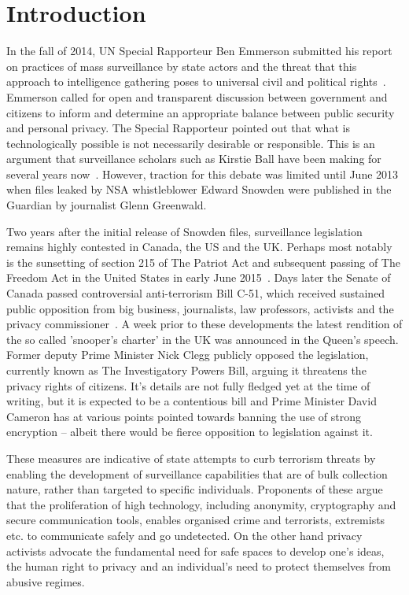 \documentclass{llncs}
\begin{document}
\section{Introduction}
\label{sec:Introduction}
In the fall of 2014, UN Special Rapporteur Ben Emmerson submitted his report on practices of mass surveillance by state actors and the threat that this approach to intelligence gathering poses to universal civil and political rights~\cite{Emerson}. Emmerson called for open and transparent discussion between government and citizens to inform and determine an appropriate balance between public security and personal privacy. The Special Rapporteur pointed out that what is technologically possible is not necessarily desirable or responsible. This is an argument that surveillance scholars such as Kirstie Ball have been making for several years now~\cite{Ball}. However, traction for this debate was limited until June 2013 when files leaked by NSA whistleblower Edward Snowden were published in the Guardian by journalist Glenn Greenwald.

Two years after the initial release of Snowden files, surveillance legislation remains highly contested in Canada, the US and the UK. Perhaps most notably is the sunsetting of section 215 of The Patriot Act and subsequent passing of The Freedom Act in the United States in early June 2015~\cite{Patriot}. Days later the Senate of Canada passed controversial anti-terrorism Bill C-51, which received sustained public opposition from big business, journalists, law professors, activists and the privacy commissioner~\cite{C-51}. A week prior to these developments the latest rendition of the so called 'snooper's charter' in the UK was announced in the Queen's speech. Former deputy Prime Minister Nick Clegg publicly opposed the legislation, currently known as The Investigatory Powers Bill, arguing it threatens the privacy rights of citizens. It's details are not fully fledged yet at the time of writing, but it is expected to be a contentious bill and Prime Minister David Cameron has at various points pointed towards banning the use of strong encryption -- albeit there would be fierce opposition to legislation against it. 

These measures are indicative of state attempts to curb terrorism threats by enabling the development of surveillance capabilities that are of bulk collection nature, rather than targeted to specific individuals. Proponents of these argue that the proliferation of high technology, including anonymity, cryptography and secure communication tools, enables organised crime and terrorists, extremists etc. to communicate safely and go undetected. On the other hand privacy activists advocate the fundamental need for safe spaces to develop one's ideas, the human right to privacy and an individual's need to protect themselves from abusive regimes.
\end{document}
